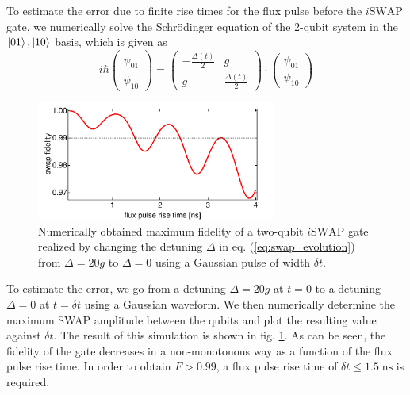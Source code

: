 \smallskip

To estimate the error due to finite rise times for the flux pulse before the $i\mathrm{SWAP}$ gate, we numerically solve the Schrödinger equation of the 2-qubit system in the $\left| 01 \right>,\left| 10 \right>$ basis, which is given as
%
\begin{equation}
i\hbar\left(\begin{array}{c} \dot{\psi}_{01} \\ \dot{\psi}_{10} \end{array}\right) = \left( \begin{array}{cc} -\frac{\Delta(t)}{2} & g \\ g & \frac{\Delta(t)}{2}  \end{array} \right)\cdot \left(\begin{array}{c} \psi_{01} \\ \psi_{10} \end{array}\right) \label{eq:swap_evolution}
\end{equation}
%

\begin{figure}
	\centering
	\includegraphics[width=0.7\textwidth]{./material/mathematica/qubit_qubit_swap_error}
	\caption[]{Numerically obtained maximum fidelity of a two-qubit $i\mathrm{SWAP}$ gate realized by changing the detuning $\Delta$ in eq. (\ref{eq:swap_evolution}) from $\Delta = 20g$ to $\Delta=0$ using a Gaussian pulse of width $\delta t$.}
	\label{fig:qubit_qubit_coupling_swap_error}
\end{figure}

To estimate the error, we go from a detuning $\Delta = 20 g$ at $t=0$ to a detuning $\Delta=0$ at $t=\delta t$ using a Gaussian waveform. We then numerically determine the maximum SWAP amplitude between the qubits and plot the resulting value against $\delta t$. The result of this simulation is shown in fig. \ref{fig:qubit_qubit_coupling_swap_error}. As can be seen, the fidelity of the gate decreases in a non-monotonous way as a function of the flux pulse rise time. In order to obtain $F>0.99$, a flux pulse rise time of $\delta t \le 1.5\;\mathrm{ns}$ is required.

